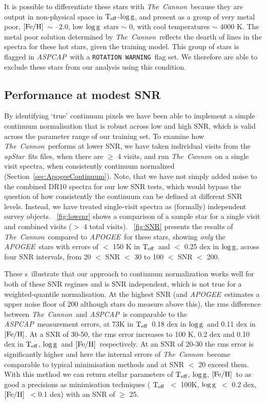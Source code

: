 \documentclass[12pt, preprint]{aastex}
\newcommand{\sectionname}{Section}
\newcommand{\figurenames}{\figurename s}
\newcommand{\tc}{\textsl{The~Cannon}}
\newcommand{\apogee}{\textsl{APOGEE}}
\newcommand{\aspcap}{\textsl{ASPCAP}}
\newcommand{\rotwarn}{\texttt{ROTATION WARNING}}
\newcommand{\apstar}{\textsl{apStar}}
\newcommand{\teff}{\mbox{$\rm T_{eff}$}}
\newcommand{\feh}{\mbox{$\rm [Fe/H]$}}
\newcommand{\logg}{\mbox{$\rm \log g$}}
\begin{document}
It is possible to differentiate these stars with \tc\ because they are output in non-physical space in \teff-\logg, and present as a group of very metal poor, \feh\ $\sim$ --2.0, low \logg\ stars $\sim$ 0, with cool temperatures $\sim$ 4000 K. The metal poor solution determined by \tc\ reflects the dearth of lines in the spectra for these hot stars, given the training model. This group of stars is flagged in \aspcap\ with a \rotwarn\ flag set. We therefore are able to exclude these stars from our analysis using this condition. 
 

 \subsection{Performance at modest SNR}
 \label{sec:lowSNR}


By identifying `true' continuum pixels we have been able to implement a simple continuum normalisation that is robust across low and high SNR, which is valid across the parameter range of our training set. To examine how \tc\ performs at lower SNR, we have taken individual visits from the \apstar\ fits files, when there are $\ge$ 4 visits, and run \tc\ on a single visit spectra, when consistently continuum normalized (\sectionname~\ref{sec:ApogeeContinuum}). Note, that we have not simply added noise to the combined DR10 spectra for our low SNR tests, which would bypass the question of how consistently the continuum can be defined at different SNR levels. Instead, we have treated single-visit spectra as (formally) independent survey objects. \figurename~\ref{fig:lowsnr} shows a comparison of a sample star for a single visit and combined visits ($>$ 4 total visits). \figurename~\ref{fig:SNR} presents the results of \tc\ compared to \apogee\ for these stars, showing \textit{only} the \apogee\ stars with errors of $<$ 150 K in \teff\ and $<$ 0.25 dex in \logg, across four SNR intervals, from 20 $<$ SNR $<$ 30 to 100 $<$ SNR $<$ 200.

These \figurenames\ illustrate that our approach to continuum normalization works well for both of these SNR regimes and is SNR independent, which is not true for a weighted-quantile normalisation. At the highest SNR (and \apogee\ estimates a upper noise floor of 200 although stars do measure above this), the rms difference between \tc\ and \aspcap\ is comparable to the \aspcap\ measurement errors, at 73K in \teff\, 0.18 dex in \logg\ and 0.11 dex in \feh. At a SNR of 30-50, the rms error increases to 100 K, 0.2 dex and 0.10 dex in \teff, \logg\ and \feh\, respectively. At an SNR of 20-30 the rms error is significantly higher and here the internal errors of \tc\ become comparable to typical minimisation methods and at SNR $<$ 20 exceed them. With this method we can return stellar parameters of \teff, \logg, \feh\ to as good a precisions as minimisation techniques ( \teff\ $<$ 100K, \logg\ $<$ 0.2 dex, \feh\ $< $0.1 dex) with an SNR of $\ge$ 25. 
 
\end{document}
